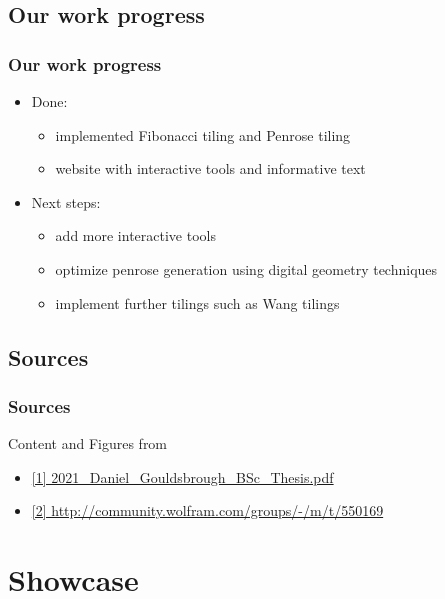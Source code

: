 \documentclass[]{beamer}
\begin{document}
\begin{frame}
  \section{Our work progress}
  \frametitle{Our work progress}
  \begin{itemize}
    \item Done:
    \begin{itemize}
      \item implemented Fibonacci tiling and Penrose tiling
      \item website with interactive tools and informative text
    \end{itemize}
    \item Next steps:
    \begin{itemize}
      \item add more interactive tools
      \item optimize penrose generation using digital geometry techniques
      \item implement further tilings such as Wang tilings
    \end{itemize}
  \end{itemize}
\end{frame}
\begin{frame}
  \section{Sources}
  \frametitle{Sources}
  Content and Figures from
  \begin{itemize}
    \item \href{http://pcwww.liv.ac.uk/~hemraj/thesis/BSc/2021_Daniel_Gouldsbrough_BSc_Thesis.pdf}{[1] 2021\_Daniel\_Gouldsbrough\_BSc\_Thesis.pdf}
    \item \href{http://community.wolfram.com/groups/-/m/t/550169}{[2] http://community.wolfram.com/groups/-/m/t/550169}
  \end{itemize}
\end{frame}



\section{Showcase}
\end{document}
